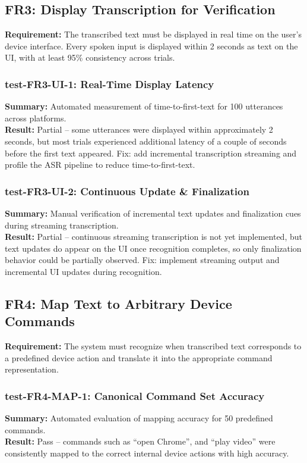 \documentclass[12pt, titlepage]{article}
\begin{document}
\subsection{FR3: Display Transcription for Verification}

\textbf{Requirement:} The transcribed text must be displayed in real time on the user's device interface. Every spoken input is displayed within 2 seconds as text on the UI, with at least 95\% consistency across trials.


\subsubsection{test-FR3-UI-1: Real-Time Display Latency}
\textbf{Summary:} Automated measurement of time-to-first-text for 100 utterances across platforms.\\
\textbf{Result:} Partial -- some utterances were displayed within approximately 2 seconds, but most trials experienced additional latency of a couple of seconds before the first text appeared. Fix: add incremental transcription streaming and profile the ASR pipeline to reduce time-to-first-text.


\subsubsection{test-FR3-UI-2: Continuous Update \& Finalization}
\textbf{Summary:} Manual verification of incremental text updates and finalization cues during streaming transcription.\\
\textbf{Result:} Partial -- continuous streaming transcription is not yet implemented, but text updates do appear on the UI once recognition completes, so only finalization behavior could be partially observed. Fix: implement streaming output and incremental UI updates during recognition.

\subsection{FR4: Map Text to Arbitrary Device Commands}

\textbf{Requirement:} The system must recognize when transcribed text corresponds to a predefined device action and translate it into the appropriate command representation.

\subsubsection{test-FR4-MAP-1: Canonical Command Set Accuracy}
\textbf{Summary:} Automated evaluation of mapping accuracy for 50 predefined commands.\\
\textbf{Result:} Pass -- commands such as ``open Chrome'', and ``play video'' were consistently mapped to the correct internal device actions with high accuracy.
\end{document}
